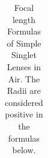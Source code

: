 \begin{table}
\begin{tabular}{|c|c|c|}
\hline
\end{tabular}
\caption{Focal length Formulas of Simple Singlet Lenses in Air.  
				 The Radii are considered positive in the formulas below.}
\label{tab:lenses_focal_length}
\end{table}



	